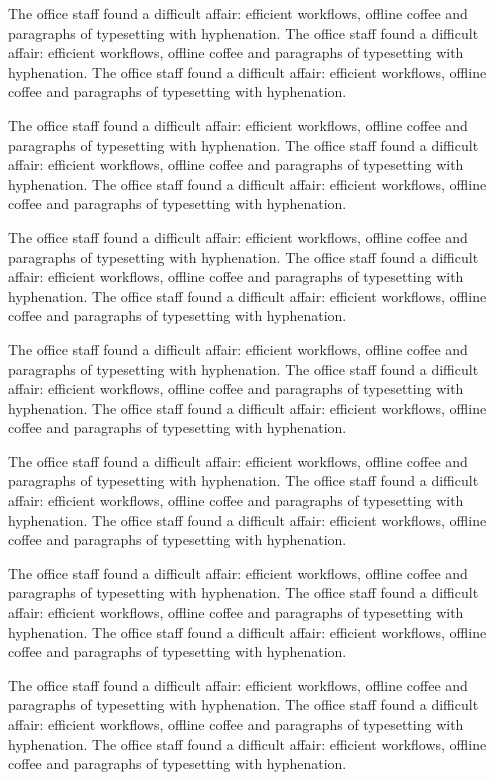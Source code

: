 \documentclass{book}
\begin{document}
The office staff found a difficult affair: efficient workflows, offline coffee and paragraphs of typesetting with hyphenation. The office staff found a difficult affair: efficient workflows, offline coffee and paragraphs of typesetting with hyphenation. The office staff found a difficult affair: efficient workflows, offline coffee and paragraphs of typesetting with hyphenation. 

The office staff found a difficult affair: efficient workflows, offline coffee and paragraphs of typesetting with hyphenation. The office staff found a difficult affair: efficient workflows, offline coffee and paragraphs of typesetting with hyphenation. The office staff found a difficult affair: efficient workflows, offline coffee and paragraphs of typesetting with hyphenation. 

The office staff found a difficult affair: efficient workflows, offline coffee and paragraphs of typesetting with hyphenation. The office staff found a difficult affair: efficient workflows, offline coffee and paragraphs of typesetting with hyphenation. The office staff found a difficult affair: efficient workflows, offline coffee and paragraphs of typesetting with hyphenation. 

The office staff found a difficult affair: efficient workflows, offline coffee and paragraphs of typesetting with hyphenation. The office staff found a difficult affair: efficient workflows, offline coffee and paragraphs of typesetting with hyphenation. The office staff found a difficult affair: efficient workflows, offline coffee and paragraphs of typesetting with hyphenation. 

The office staff found a difficult affair: efficient workflows, offline coffee and paragraphs of typesetting with hyphenation. The office staff found a difficult affair: efficient workflows, offline coffee and paragraphs of typesetting with hyphenation. The office staff found a difficult affair: efficient workflows, offline coffee and paragraphs of typesetting with hyphenation. 

The office staff found a difficult affair: efficient workflows, offline coffee and paragraphs of typesetting with hyphenation. The office staff found a difficult affair: efficient workflows, offline coffee and paragraphs of typesetting with hyphenation. The office staff found a difficult affair: efficient workflows, offline coffee and paragraphs of typesetting with hyphenation. 

The office staff found a difficult affair: efficient workflows, offline coffee and paragraphs of typesetting with hyphenation. The office staff found a difficult affair: efficient workflows, offline coffee and paragraphs of typesetting with hyphenation. The office staff found a difficult affair: efficient workflows, offline coffee and paragraphs of typesetting with hyphenation. 
\end{document}
